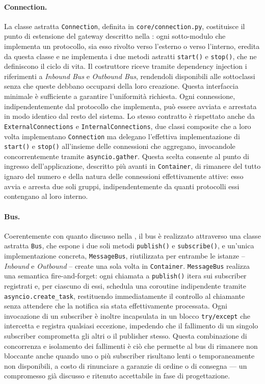 \paragraph{Connection.}
La classe astratta \texttt{Connection}, definita in \texttt{core/connection.py}, costituisce il punto di estensione del gateway descritto nella : ogni sotto-modulo che implementa un protocollo, sia esso rivolto verso l'esterno o verso l'interno, eredita da questa classe e ne implementa i due metodi astratti \texttt{start()} e \texttt{stop()}, che ne definiscono il ciclo di vita. Il costruttore riceve tramite dependency injection i riferimenti a \textit{Inbound Bus} e \textit{Outbound Bus}, rendendoli disponibili alle sottoclassi senza che queste debbano occuparsi della loro creazione. Questa interfaccia minimale è sufficiente a garantire l'uniformità richiesta. Ogni connessione, indipendentemente dal protocollo che implementa, può essere avviata e arrestata in modo identico dal resto del sistema. Lo stesso contratto è rispettato anche da \texttt{ExternalConnections} e \texttt{InternalConnections}, due classi composite che a loro volta implementano \texttt{Connection} ma delegano l'effettiva implementazione di \texttt{start()} e \texttt{stop()} all'insieme delle connessioni che aggregano, invocandole concorrentemente tramite \texttt{asyncio.gather}. Questa scelta consente al punto di ingresso dell'applicazione, descritto più avanti in \texttt{Container}, di rimanere del tutto ignaro del numero e della natura delle connessioni effettivamente attive: esso avvia e arresta due soli gruppi, indipendentemente da quanti protocolli essi contengano al loro interno.

\paragraph{Bus.}
Coerentemente con quanto discusso nella , il bus è realizzato attraverso una classe astratta \texttt{Bus}, che espone i due soli metodi \texttt{publish()} e \texttt{subscribe()}, e un'unica implementazione concreta, \texttt{MessageBus}, riutilizzata per entrambe le istanze -- \textit{Inbound} e \textit{Outbound} -- create una sola volta in \texttt{Container}. \texttt{MessageBus} realizza una semantica fire-and-forget: ogni chiamata a \texttt{publish()} itera sui subscriber registrati e, per ciascuno di essi, schedula una coroutine indipendente tramite \texttt{asyncio.create\_task}, restituendo immediatamente il controllo al chiamante senza attendere che la notifica sia stata effettivamente processata. Ogni invocazione di un subscriber è inoltre incapsulata in un blocco \texttt{try/except} che intercetta e registra qualsiasi eccezione, impedendo che il fallimento di un singolo subscriber comprometta gli altri o il publisher stesso. Questa combinazione di concorrenza e isolamento dei fallimenti è ciò che permette al bus di rimanere non bloccante anche quando uno o più subscriber risultano lenti o temporaneamente non disponibili, a costo di rinunciare a garanzie di ordine o di consegna --- un compromesso già discusso e ritenuto accettabile in fase di progettazione.

